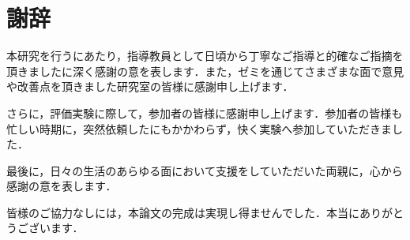 \documentclass[main]{subfiles}
\begin{document}
{}
\chapter*{謝辞}
本研究を行うにあたり，指導教員として日頃から丁寧なご指導と的確なご指摘を頂きました\teacherName に深く感謝の意を表します．また，ゼミを通じてさまざまな面で意見や改善点を頂きました研究室の皆様に感謝申し上げます．

さらに，評価実験に際して，参加者の皆様に感謝申し上げます．参加者の皆様も忙しい時期に，突然依頼したにもかかわらず，快く実験へ参加していただきました．

最後に，日々の生活のあらゆる面において支援をしていただいた両親に，心から感謝の意を表します．

皆様のご協力なしには，本論文の完成は実現し得ませんでした．本当にありがとうございます．
\end{document}
